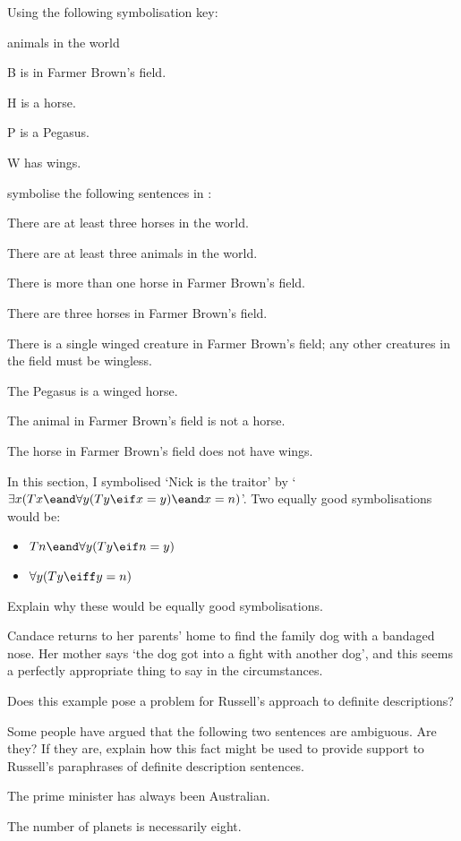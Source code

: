 \problempart Using the following symbolisation key:
\begin{ekey}
\item[\text{domain}] animals in the world
\item[B]  is in Farmer Brown's field.
\item[H]  is a horse.
\item[P]  is a Pegasus.
\item[W]  has wings.
\end{ekey}
symbolise the following sentences in \FOL:
\begin{earg}
\item There are at least three horses in the world.
\item There are at least three animals in the world.
\item There is more than one horse in Farmer Brown's field.
\item There are three horses in Farmer Brown's field.
\item There is a single winged creature in Farmer Brown's field; any other creatures in the field must be wingless.
\item The Pegasus is a winged horse.
\item The animal in Farmer Brown's field is not a horse.
\item The horse in Farmer Brown's field does not have wings.
\end{earg}

\problempart
In this section, I symbolised `Nick is the traitor' by `$\exists x (Tx \eand \forall y(Ty \eif x = y) \eand x = n)$'. Two equally good symbolisations would be:
	\begin{itemize}
		\item $Tn \eand \forall y(Ty \eif n = y)$
		\item $\forall y(Ty \eiff y = n)$
	\end{itemize}
Explain why these would be equally good symbolisations.

\problempart
Candace returns to her parents' home to find the family dog with a bandaged nose. Her mother says `the dog got into a fight with another dog', and this seems a perfectly appropriate thing to say in the circumstances. 

Does this example pose a problem for Russell's approach to definite descriptions?




\problempart
Some people have argued that the following two sentences are ambiguous. Are they? If they are, explain how this fact might be used to provide support to Russell's paraphrases of definite description sentences. \begin{earg}
	\item The prime minister has always been Australian.
	\item The number of planets is necessarily eight.
\end{earg}

